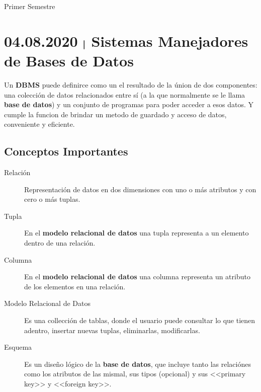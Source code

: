 \documentclass[a4paper]{book}
\begin{document}
    \titPag
    \tableofcontents


    \begin{chapter}{Primer Semestre}
    \label{chap:primer_semestre}

    \section{04.08.2020 $\mybar$ Sistemas Manejadores de Bases de Datos}
    \label{sec:sistemas_manejadores_de_bases_de_datos}

        Un \textbf{DBMS} puede definirce como un el resultado de la únion de
        dos componentes: una colección de datos relacionados entre sí (a la que
        normalmente se le llama \textbf{base de datos}) y un conjunto de
        programas para poder acceder a esos datos. Y cumple la funcion de
        brindar un metodo de guardado y acceso de datos, conveniente y
        eficiente.

        \subsection{Conceptos Importantes}
        \label{ssec:conceptos_importantes}

        \begin{description}
            \item[Relación] Representación de datos en dos dimensiones con uno
                o más atributos y con cero o más tuplas.
            \item[Tupla] En el \textbf{modelo relacional de datos} una tupla
                representa a un elemento dentro de una relación.
            \item[Columna] En el \textbf{modelo relacional de datos} una
                columna representa un atributo de los elementos en una
                relación.
            \item[Modelo Relacional de Datos] Es una collección de tablas,
                donde el usuario puede consultar lo que tienen adentro,
                insertar nuevas tuplas, eliminarlas, modificarlas.
            \item[Esquema] Es un diseño lógico de la \textbf{base de datos},
                que incluye tanto las relaciónes como los atributos de las
                mismal, sus tipos (opcional) y sus <<primary key>> y <<foreign
                key>>.
        \end{description}










    \end{chapter}





    \printbibliography
\end{document}
